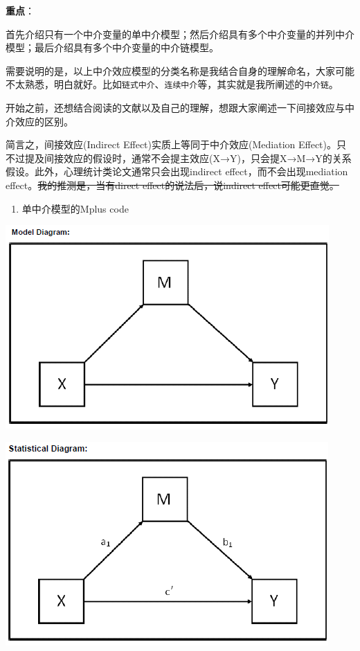 \documentclass[
]{book}
\providecommand{\tightlist}{%
  \setlength{\itemsep}{0pt}\setlength{\parskip}{0pt}}
\begin{document}
\textbf{重点}：

首先介绍只有一个中介变量的单中介模型；然后介绍具有多个中介变量的并列中介模型；最后介绍具有多个中介变量的中介链模型。

需要说明的是，以上中介效应模型的分类名称是我结合自身的理解命名，大家可能不太熟悉，明白就好。比如\texttt{链式中介}、\texttt{连续中介}等，其实就是我所阐述的\texttt{中介链}。

开始之前，还想结合阅读的文献以及自己的理解，想跟大家阐述一下间接效应与中介效应的区别。

简言之，间接效应(Indirect Effect)实质上等同于中介效应(Mediation Effect)。只不过提及间接效应的假设时，通常不会提主效应(X→Y)，只会提X→M→Y的关系假设。此外，心理统计类论文通常只会出现indirect effect，而不会出现mediation effect。\sout{我的推测是，当有direct effect的说法后，说indirect effect可能更直觉。}

\begin{enumerate}
\def\labelenumi{\arabic{enumi}.}
\tightlist
\item
  单中介模型的Mplus code
\end{enumerate}

\includegraphics{figs/1131.png}

\includegraphics{figs/1132.png}
\end{document}
